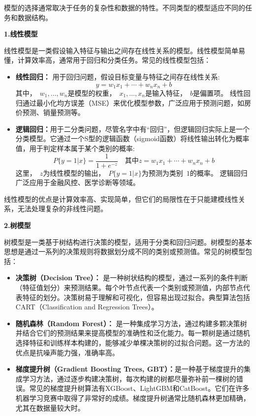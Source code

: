 模型的选择通常取决于任务的复杂性和数据的特性。不同类型的模型适应不同的任务和数据结构。

{\bf 1.线性模型}

线性模型是一类假设输入特征与输出之间存在线性关系的模型。线性模型简单易懂，计算效率高，通常用于回归和分类任务。常见的线性模型包括：
\begin{itemize}
\item {\bf 线性回归：} 用于回归问题，假设目标变量与特征之间存在线性关系:
$$
y =w_1x_1+\cdots+ w_nx_n+b
$$
其中，~$w_1,\dots, w_n$是模型的权重，~$x_1,\dots,x_n$是输入特征，~$b$是偏置项。
线性回归通过最小化均方误差（MSE）来优化模型参数，广泛应用于预测问题，如房价预测、销量预测等。

\item  {\bf 逻辑回归：}用于二分类问题，尽管名字中有“回归”，但逻辑回归实际上是一个分类模型。它通过一个S型的逻辑函数（sigmoid函数）将线性输出转化为概率值，用于判定样本属于某个类别的概率:
$$
P\{ y=1 |x\} = \frac{1}{1+e^{-z}} \quad \mbox{其中} z =w_1x_1+\cdots+ w_nx_n+b
$$
这里，~$z$为线性模型的输出，~$P\{ y=1 |x\} $为预测为类别~$1$的概率。
逻辑回归广泛应用于金融风控、医学诊断等领域。
\end{itemize}
线性模型的优点是计算效率高、实现简单，但它们的局限性在于只能建模线性关系，无法处理复杂的非线性问题。

{\bf 2.树模型}

树模型是一类基于树结构进行决策的模型，适用于分类和回归问题。树模型的基本思想是通过一系列的决策规则将数据划分成不同的类别或预测值。常见的树模型包括：

\begin{itemize}
\item  {\bf 决策树（Decision Tree）：} 是一种树状结构的模型，通过一系列的条件判断（特征值划分）来预测结果。每个叶节点代表一个类别或预测值，内部节点代表特征的划分。决策树易于理解和可视化，但容易出现过拟合。典型算法包括CART（Classification and Regression Trees）。

\item  {\bf  随机森林（Random Forest）： }是一种集成学习方法，通过构建多颗决策树并结合它们的预测结果来提高模型的准确性和泛化能力。每一颗树是通过随机选择特征和训练样本构建的，能够减少单棵决策树的过拟合问题。这一方法的优点是抗噪声能力强，准确率高。

\item  {\bf  梯度提升树（Gradient Boosting Trees, GBT）：}是一种基于梯度提升的集成学习方法，通过逐步构建决策树，每次构建的树都尽量弥补前一棵树的错误。常见的梯度提升树算法有XGBoost、LightGBM和CatBoost。它们在许多机器学习竞赛中取得了非常好的成绩。梯度提升树通常比随机森林更加精确，尤其在数据量较大时。
\end{itemize}

